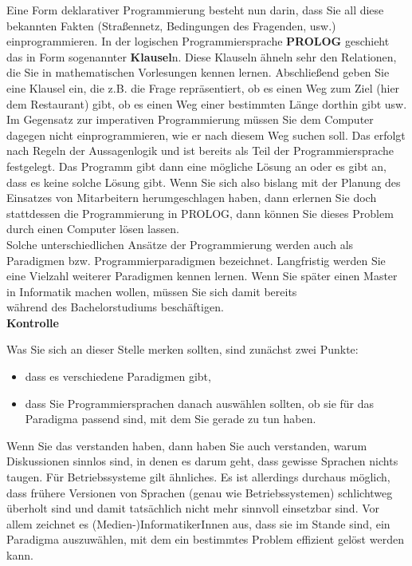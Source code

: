 Eine Form deklarativer Programmierung besteht nun darin, dass Sie all diese bekannten Fakten (Straßennetz, Bedingungen des Fragenden, usw.) einprogrammieren. In der logischen Programmiersprache \textbf{PROLOG} geschieht das in Form sogenannter \textbf{Klausel}n. Diese Klauseln ähneln sehr den Relationen, die Sie in mathematischen Vorlesungen kennen lernen. Abschließend geben Sie eine Klausel ein, die z.B. die Frage repräsentiert, ob es einen Weg zum Ziel (hier dem Restaurant) gibt, ob es einen Weg einer bestimmten Länge dorthin gibt usw. Im Gegensatz zur imperativen Programmierung müssen Sie dem Computer dagegen nicht einprogrammieren, wie er nach diesem Weg suchen soll. Das erfolgt nach Regeln der Aussagenlogik und ist bereits als Teil der Programmiersprache festgelegt. Das Programm gibt dann eine mögliche Lösung an oder es gibt an, dass es keine solche Lösung gibt. Wenn Sie sich also bislang mit der Planung des Einsatzes von Mitarbeitern herumgeschlagen haben, dann erlernen Sie doch stattdessen die Programmierung in PROLOG, dann können Sie dieses Problem durch einen Computer lösen lassen.\\

Solche unterschiedlichen Ansätze der Programmierung werden auch als Paradigmen bzw. Programmierparadigmen bezeichnet. Langfristig werden Sie eine Vielzahl weiterer Paradigmen kennen lernen. Wenn Sie später einen Master in Informatik machen wollen, müssen Sie sich damit bereits\\
während des Bachelorstudiums beschäftigen.\\

\textbf{Kontrolle}

Was Sie sich an dieser Stelle merken sollten, sind zunächst zwei Punkte: 
\begin{itemize}
	\item dass es verschiedene Paradigmen gibt,
	\item dass Sie Programmiersprachen danach auswählen sollten, ob sie für das Paradigma passend sind, mit dem Sie gerade zu tun haben.
\end{itemize}

Wenn Sie das verstanden haben, dann haben Sie auch verstanden, warum Diskussionen sinnlos sind, in denen es darum geht, dass gewisse Sprachen nichts taugen. Für Betriebssysteme gilt ähnliches. Es ist allerdings durchaus möglich, dass frühere Versionen von Sprachen (genau wie Betriebssystemen) schlichtweg überholt sind und damit tatsächlich nicht mehr sinnvoll einsetzbar sind. Vor allem zeichnet es (Medien-)InformatikerInnen aus, dass sie im Stande sind, ein Paradigma auszuwählen, mit dem ein bestimmtes Problem effizient gelöst werden kann.\\

